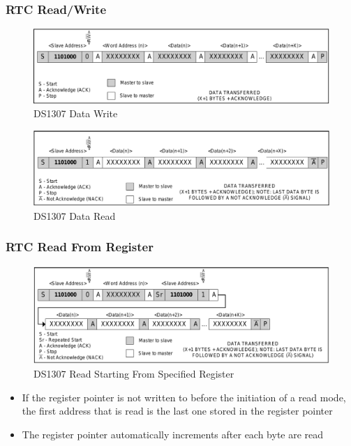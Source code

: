 \begin{frame}
  \frametitle{RTC Read/Write}
  \vspace*{-2mm}
  \begin{figure}
    \centering
    \includegraphics[scale=0.35]{images/ds1307-write.png}
    \caption{DS1307 Data Write}
  \end{figure}
  \vspace*{-5mm}
  \begin{figure}
    \centering
    \includegraphics[scale=0.35]{images/ds1307-read.png}
    \caption{DS1307 Data Read}
  \end{figure}
  \vspace*{-12mm}
\end{frame}

\begin{frame}
  \frametitle{RTC Read From Register}
  \begin{figure}
    \centering
    \includegraphics[scale=0.35]{images/ds1307-read-reg.png}
    \caption{DS1307 Read Starting From Specified Register}
  \end{figure}
  \vspace*{-5mm}
  \begin{itemize}
    \item If the register pointer is not written to before the initiation of a
          read mode, the first address that is read is the last one stored in
          the register pointer
    \item The register pointer automatically increments after each byte are read
  \end{itemize}
\end{frame}

